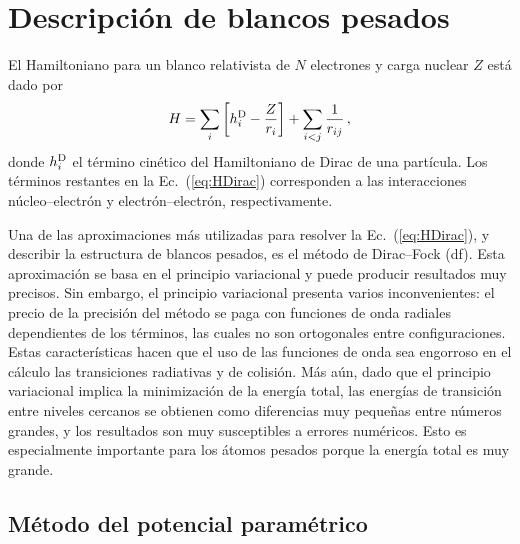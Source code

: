 \section{Descripción de blancos pesados}
\label{sec:method-target}

El Hamiltoniano para un blanco relativista de $N$ electrones y carga 
nuclear $Z$ está dado por
\begin{equation}
H = \sum_i \left[ h_i^{\mbox{\scriptsize D}} - \frac{Z}{r_i}\right]
+ \sum_{i<j}\frac{1}{r_{ij}}\,,
\label{eq:HDirac}
\end{equation}
donde $h_i^{\mbox{\scriptsize D}}$ el término cinético del 
Hamiltoniano de Dirac de una partícula. Los términos restantes en la
Ec.~(\ref{eq:HDirac}) corresponden a las interacciones 
núcleo--electrón y electrón--electrón, respectivamente. 

Una de las aproximaciones más utilizadas para resolver la 
Ec.~(\ref{eq:HDirac}), y describir la estructura de blancos pesados, es 
el método de Dirac--Fock (\acs{df}). Esta aproximación se basa en el 
principio 
variacional y puede producir resultados muy precisos. Sin embargo, el 
principio variacional presenta varios inconvenientes: el precio de la 
precisión del método se paga con funciones de onda radiales dependientes 
de los términos, las cuales no son ortogonales entre configuraciones. 
Estas características hacen que el uso de las funciones de onda sea 
engorroso en el cálculo las transiciones radiativas y de colisión. Más 
aún, dado que el principio variacional implica la minimización de la 
energía total, las energías de transición entre niveles cercanos se 
obtienen como diferencias muy pequeñas entre números grandes, y los 
resultados son muy susceptibles a errores numéricos. Esto es 
especialmente importante para los átomos pesados porque la energía total 
es muy grande. 

\subsection{Método del potencial paramétrico}

